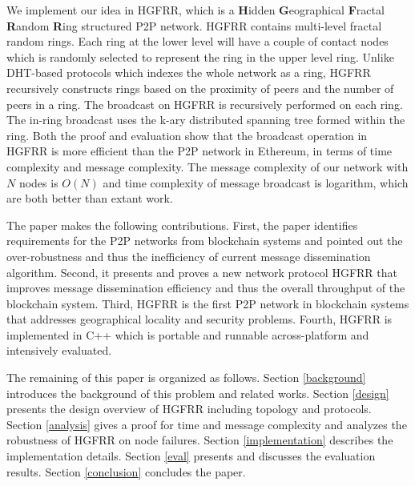 We implement our idea in HGFRR, which is a \textbf{H}idden \textbf{G}eographical \textbf{F}ractal \textbf{R}andom \textbf{R}ing structured P2P network. HGFRR contains multi-level fractal random rings. Each ring at the lower level will have a couple of contact nodes which is randomly selected to represent the ring in the upper level ring. Unlike DHT-based protocols which indexes the whole network as a ring, HGFRR recursively constructs rings based on the proximity of peers and the number of peers in a ring. The broadcast on HGFRR is recursively performed on each ring. The in-ring broadcast uses the k-ary distributed spanning tree formed within the ring. Both the proof and evaluation show that the broadcast operation in HGFRR is more efficient than the P2P network in Ethereum, in terms of time complexity and message complexity. The message complexity of our network with $N$ nodes is $O(N)$ and time complexity of message broadcast is logarithm, which are both better than extant work.

The paper makes the following contributions. First, the paper identifies requirements for the P2P networks from blockchain systems and pointed out the over-robustness and thus the inefficiency of current message dissemination algorithm. Second, it presents and proves a new network protocol HGFRR that improves message dissemination efficiency and thus the overall throughput of the blockchain system. Third, HGFRR is the first P2P network in blockchain systems that addresses geographical locality and security problems. Fourth, HGFRR is implemented in C++ which is portable and runnable across-platform and intensively evaluated.

The remaining of this paper is organized as follows. Section \cref{background} introduces the background of this problem and related works. Section \cref{design} presents the design overview of HGFRR including topology and protocols. Section \cref{analysis} gives a proof for time and message complexity and analyzes the robustness of HGFRR on node failures. Section \cref{implementation} describes the implementation details. Section \cref{eval} presents and discusses the evaluation results. Section \cref{conclusion} concludes the paper.